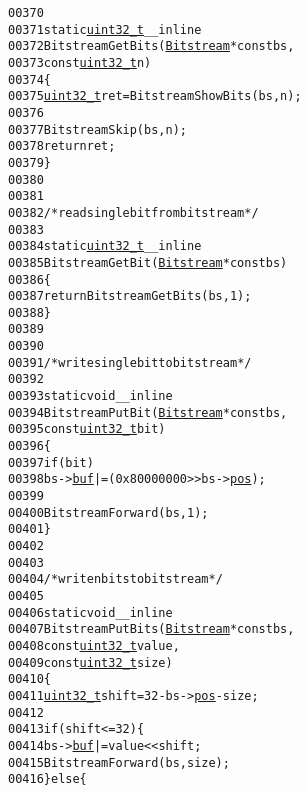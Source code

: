 \begin{footnotesize}
\begin{alltt}
00370 
00371 \textcolor{keyword}{static} \hyperlink{_types_8h_a04909d1366bb244ff2482beb51635f37}{uint32_t} \_\_inline
00372 BitstreamGetBits(\hyperlink{struct_bitstream}{Bitstream} * \textcolor{keyword}{const} bs,
00373                                  \textcolor{keyword}{const} \hyperlink{_types_8h_a04909d1366bb244ff2482beb51635f37}{uint32_t} n)
00374 \{
00375         \hyperlink{_types_8h_a04909d1366bb244ff2482beb51635f37}{uint32_t} ret = BitstreamShowBits(bs, n);
00376 
00377         BitstreamSkip(bs, n);
00378         \textcolor{keywordflow}{return} ret;
00379 \}
00380 
00381 
00382 \textcolor{comment}{/* read single bit from bitstream */}
00383 
00384 \textcolor{keyword}{static} \hyperlink{_types_8h_a04909d1366bb244ff2482beb51635f37}{uint32_t} \_\_inline
00385 BitstreamGetBit(\hyperlink{struct_bitstream}{Bitstream} * \textcolor{keyword}{const} bs)
00386 \{
00387         \textcolor{keywordflow}{return} BitstreamGetBits(bs, 1);
00388 \}
00389 
00390 
00391 \textcolor{comment}{/* write single bit to bitstream */}
00392 
00393 \textcolor{keyword}{static} \textcolor{keywordtype}{void} \_\_inline
00394 BitstreamPutBit(\hyperlink{struct_bitstream}{Bitstream} * \textcolor{keyword}{const} bs,
00395                                 \textcolor{keyword}{const} \hyperlink{_types_8h_a04909d1366bb244ff2482beb51635f37}{uint32_t} bit)
00396 \{
00397         \textcolor{keywordflow}{if} (bit)
00398                 bs->\hyperlink{struct_bitstream_aa6e7d5fa7c3bcfaac4cda5c4b07f8aa1}{buf} |= (0x80000000 >> bs->\hyperlink{struct_bitstream_ac7479c4c4e57d10bbfdd90baf6e731a4}{pos});
00399 
00400         BitstreamForward(bs, 1);
00401 \}
00402 
00403 
00404 \textcolor{comment}{/* write n bits to bitstream */}
00405 
00406 \textcolor{keyword}{static} \textcolor{keywordtype}{void} \_\_inline
00407 BitstreamPutBits(\hyperlink{struct_bitstream}{Bitstream} * \textcolor{keyword}{const} bs,
00408                                  \textcolor{keyword}{const} \hyperlink{_types_8h_a04909d1366bb244ff2482beb51635f37}{uint32_t} value,
00409                                  \textcolor{keyword}{const} \hyperlink{_types_8h_a04909d1366bb244ff2482beb51635f37}{uint32_t} size)
00410 \{
00411         \hyperlink{_types_8h_a04909d1366bb244ff2482beb51635f37}{uint32_t} shift = 32 - bs->\hyperlink{struct_bitstream_ac7479c4c4e57d10bbfdd90baf6e731a4}{pos} - size;
00412 
00413         \textcolor{keywordflow}{if} (shift <= 32) \{
00414                 bs->\hyperlink{struct_bitstream_aa6e7d5fa7c3bcfaac4cda5c4b07f8aa1}{buf} |= value << shift;
00415                 BitstreamForward(bs, size);
00416         \} \textcolor{keywordflow}{else} \{

\end{alltt}
\end{footnotesize}
